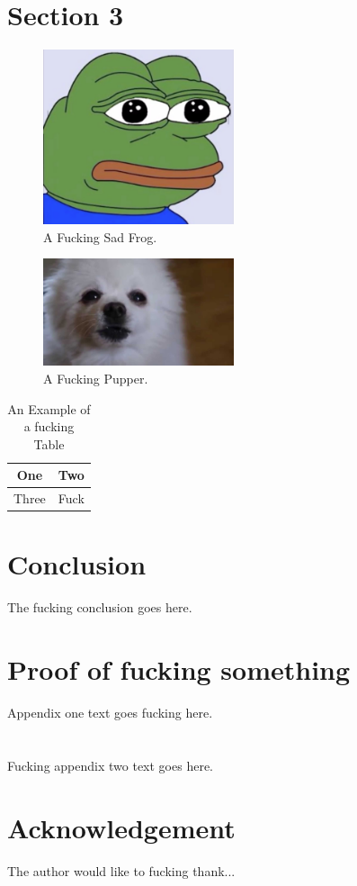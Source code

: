 \documentclass[journal,transmag]{IEEEtran}
\begin{document}
\section{Section 3}
	\lipsum[9-10]
	
\begin{figure}[!t]
	\centering
	\includegraphics[width= 0.5\textwidth]{IMAGES/exampleImage}
	\caption{A Fucking Sad Frog.}
	\label{fig_frog}
\end{figure}

\begin{figure}[!t]
	\centering
	\includegraphics[width= 0.5\textwidth]{IMAGES/fig2}
	\caption{A Fucking Pupper.}
	\label{fig_pup}
\end{figure}

\begin{table}[!t]
	\renewcommand{\arraystretch}{1.3}
	\caption{An Example of a fucking Table}
	\label{table_example}
	\centering
	\begin{tabular}{|c|c|}
		\hline
		One & Two\\
		\hline
		Three & Fuck\\
		\hline
	\end{tabular}
\end{table}

\section{Conclusion}
The fucking conclusion goes here.

\newpage

\appendices
\section{Proof of fucking something}
	Appendix one text goes fucking here.

\section{}
	Fucking appendix two text goes here.

\section*{Acknowledgement}
	The author would like to fucking thank...



\end{document}
